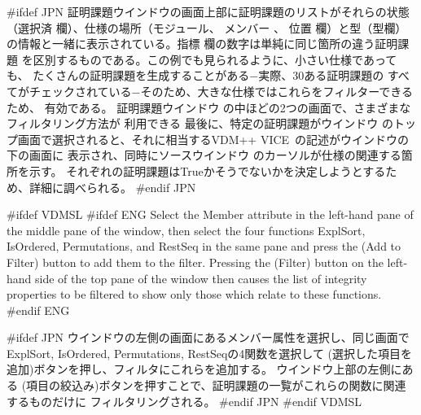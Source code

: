 \documentclass[\pformat,12pt]{article}
\newcommand{\vdmslpp}{VDM-SL}
\newcommand{\vdmslpp}{VDM++}
\renewcommand{\vdmslpp}{VDM++ VICE}
\newcommand{\guicmd}[1]{{\sf #1}}
\newcommand{\guicmd}[1]{{\gt #1}}
\begin{document}
#ifdef JPN
\guicmd{証明課題ウインドウ}の画面上部に証明課題のリストがそれらの状態
（\guicmd{選択済} 欄）、仕様の場所（\guicmd{モジュール}、 \guicmd{メンバー} 、 \guicmd{位置} 欄）と型（\guicmd{型}欄）
の情報と一緒に表示されている。\guicmd{指標} 欄の数字は単純に同じ箇所の違う証明課題
を区別するものである。この例でも見られるように、小さい仕様であっても、
たくさんの証明課題を生成することがある−実際、30ある証明課題の
すべてがチェックされている−そのため、大きな仕様ではこれらをフィルターできるため、
有効である。
\guicmd{証明課題ウインドウ} の中ほどの2つの画面で、さまざまなフィルタリング方法が
利用できる
最後に、特定の証明課題がウインドウ
のトップ画面で選択されると、それに相当する\vdmslpp\ の記述がウインドウの下の画面に
表示され、同時に\guicmd{ソースウインドウ} のカーソルが仕様の関連する箇所を示す。
それぞれの証明課題はTrueかそうでないかを決定しようとするため、詳細に調べられる。
#endif JPN

#ifdef VDMSL
#ifdef ENG
Select the \guicmd{Member} attribute in the left-hand pane of the
middle pane of the window, then select the four functions
\guicmd{ExplSort}, \guicmd{IsOrdered}, \guicmd{Permutations}, and
\guicmd{RestSeq} in the same pane and press the
(\guicmd{Add to Filter}) button to add them to the filter. Pressing the 
(\guicmd{Filter}) button on the left-hand side of the top pane of
the window then causes the list of integrity properties to be filtered
to show only those which relate to these functions.
#endif ENG

#ifdef JPN
ウインドウの左側の画面にある\guicmd{メンバー}属性を選択し、同じ画面で\guicmd{ExplSort}, 
\guicmd{IsOrdered}, \guicmd{Permutations}, \guicmd{RestSeq}の4関数を選択して
(\guicmd{選択した項目を追加})ボタンを押し、フィルタにこれらを追加する。
ウインドウ上部の左側にある  
(\guicmd{項目の絞込み})ボタンを押すことで、証明課題の一覧がこれらの関数に関連するものだけに
フィルタリングされる。
#endif JPN
#endif VDMSL
\end{document}
